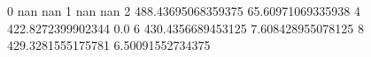 0 nan nan
1 nan nan
2 488.43695068359375 65.60971069335938
4 422.8272399902344 0.0
6 430.4356689453125 7.608428955078125
8 429.3281555175781 6.50091552734375
